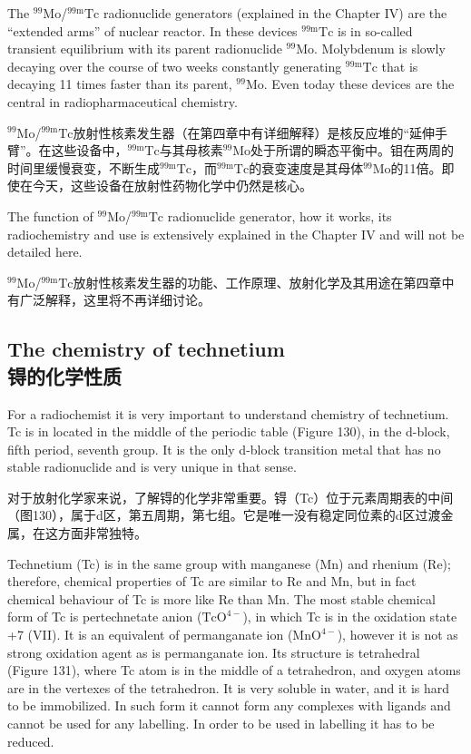 \documentclass[dvipsnames, svgnames,a4paper,11pt]{article}
\begin{document}
The ${}^\mathrm{99}\mathrm{Mo}$/${}^\mathrm{99m}\mathrm{Tc}$ radionuclide generators (explained in the Chapter IV) are the
“extended arms” of nuclear reactor. In these devices ${}^\mathrm{99m}\mathrm{Tc}$ is in so-called transient
equilibrium with its parent radionuclide ${}^\mathrm{99}\mathrm{Mo}$. Molybdenum is slowly decaying over
the course of two weeks constantly generating ${}^\mathrm{99m}\mathrm{Tc}$ that is decaying 11 times faster
than its parent, ${}^\mathrm{99}\mathrm{Mo}$. Even today these devices are the central in
radiopharmaceutical chemistry.

${}^\mathrm{99}\mathrm{Mo}$/${}^\mathrm{99m}\mathrm{Tc}$放射性核素发生器（在第四章中有详细解释）是核反应堆的“延伸手臂”。在这些设备中，${}^\mathrm{99m}\mathrm{Tc}$与其母核素${}^\mathrm{99}\mathrm{Mo}$处于所谓的瞬态平衡中。钼在两周的时间里缓慢衰变，不断生成${}^\mathrm{99m}\mathrm{Tc}$，而${}^\mathrm{99m}\mathrm{Tc}$的衰变速度是其母体${}^\mathrm{99}\mathrm{Mo}$的11倍。即使在今天，这些设备在放射性药物化学中仍然是核心。

The function of ${}^\mathrm{99}\mathrm{Mo}$/${}^\mathrm{99m}\mathrm{Tc}$ radionuclide generator, how it works, its radiochemistry
and use is extensively explained in the Chapter IV and will not be detailed here.

${}^\mathrm{99}\mathrm{Mo}$/${}^\mathrm{99m}\mathrm{Tc}$放射性核素发生器的功能、工作原理、放射化学及其用途在第四章中有广泛解释，这里将不再详细讨论。

\subsection{The chemistry of technetium \\锝的化学性质}

For a radiochemist it is very important to understand chemistry of technetium. Tc is
in located in the middle of the periodic table (Figure 130), in the d-block, fifth period,
seventh group. It is the only d-block transition metal that has no stable radionuclide
and is very unique in that sense.

对于放射化学家来说，了解锝的化学非常重要。锝（Tc）位于元素周期表的中间（图130），属于d区，第五周期，第七组。它是唯一没有稳定同位素的d区过渡金属，在这方面非常独特。

Technetium (Tc) is in the same group with manganese (Mn) and rhenium (Re);
therefore, chemical properties of Tc are similar to Re and Mn, but in fact chemical
behaviour of Tc is more like Re than Mn. The most stable chemical form of Tc is
pertechnetate anion ($\mathrm{TcO^{4-}}$), in which Tc is in the oxidation state +7 (VII). It is an
equivalent of permanganate ion ($\mathrm{MnO^{4-}}$), however it is not as strong oxidation agent
as is permanganate ion. Its structure is tetrahedral (Figure 131), where Tc atom is in
the middle of a tetrahedron, and oxygen atoms are in the vertexes of the tetrahedron.
It is very soluble in water, and it is hard to be immobilized. In such form it cannot
form any complexes with ligands and cannot be used for any labelling. In order to be
used in labelling it has to be reduced.
\end{document}
